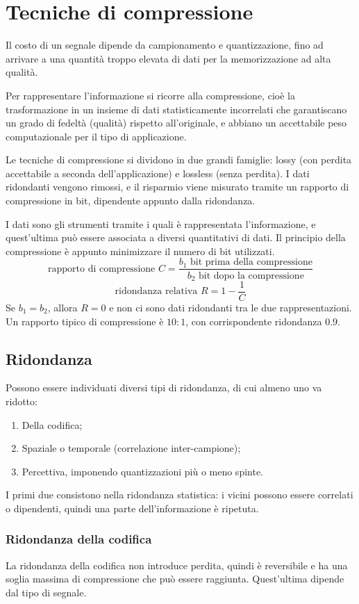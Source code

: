 \section{Tecniche di compressione}
Il costo di un segnale dipende da campionamento e quantizzazione, fino ad arrivare a una quantità troppo elevata di dati per la memorizzazione ad alta qualità.

Per rappresentare l'informazione si ricorre alla compressione, cioè la trasformazione in un insieme di dati statisticamente incorrelati che garantiscano un grado di fedeltà (qualità) rispetto all'originale, e abbiano un accettabile peso computazionale per il tipo di applicazione.

Le tecniche di compressione si dividono in due grandi famiglie: lossy (con perdita accettabile a seconda dell'applicazione) e lossless (senza perdita). I dati ridondanti vengono rimossi, e il risparmio viene misurato tramite un rapporto di compressione in bit, dipendente appunto dalla ridondanza. 

I dati sono gli strumenti tramite i quali è rappresentata l'informazione, e quest'ultima può essere associata a diversi quantitativi di dati. Il principio della compressione è appunto minimizzare il numero di bit utilizzati. 
$$\text{rapporto di compressione } C = \frac{b_1 \text{ bit prima della compressione}}{b_2 \text{ bit dopo la compressione}}$$
$$\text{ridondanza relativa } R = 1 - \frac{1}{C}$$
Se $b_1 = b_2$, allora $R = 0$ e non ci sono dati ridondanti tra le due rappresentazioni. Un rapporto tipico di compressione è $10 : 1$, con corrispondente ridondanza $0.9$.

\subsection{Ridondanza}
Possono essere individuati diversi tipi di ridondanza, di cui almeno uno va ridotto:
\begin{enumerate}
	\item Della codifica;
	\item Spaziale o temporale (correlazione inter-campione);
	\item Percettiva, imponendo quantizzazioni più o meno spinte.
\end{enumerate}

I primi due consistono nella ridondanza statistica: i vicini possono essere correlati o dipendenti, quindi una parte dell'informazione è ripetuta. 

\subsubsection{Ridondanza della codifica}
La ridondanza della codifica non introduce perdita, quindi è reversibile e ha una soglia massima di compressione che può essere raggiunta. Quest'ultima dipende dal tipo di segnale.

